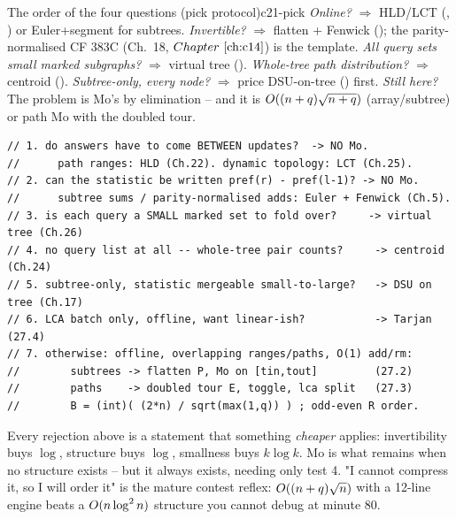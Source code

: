 \begin{definition}{The order of the four questions (pick protocol)}{c21-pick}
\emph{Online?} \(\Rightarrow\) HLD/LCT (, ) or Euler+segment
for subtrees.  \emph{Invertible?} \(\Rightarrow\) flatten + Fenwick
(); the parity-normalised CF 383C (Ch.~18, \(\chref{c14}\)) is the
template.  \emph{All query sets
small marked subgraphs?} \(\Rightarrow\) virtual tree ().
\emph{Whole-tree path distribution?} \(\Rightarrow\) centroid ().
\emph{Subtree-only, every node?} \(\Rightarrow\) price DSU-on-tree ()
first.  \emph{Still here?} The problem is Mo's by elimination -- and it is
\(O((n+q)\sqrt{n+q})\) (array/subtree) or path Mo with the doubled tour.
\end{definition}

\begin{lstlisting}[caption={The pick protocol as a decision skeleton -- paste-ready comments for contest code; each branch names the chapter that owns the technique}, label={lst:c21-kit}]
// 1. do answers have to come BETWEEN updates?  -> NO Mo.
//      path ranges: HLD (Ch.22). dynamic topology: LCT (Ch.25).
// 2. can the statistic be written pref(r) - pref(l-1)? -> NO Mo.
//      subtree sums / parity-normalised adds: Euler + Fenwick (Ch.5).
// 3. is each query a SMALL marked set to fold over?     -> virtual tree (Ch.26)
// 4. no query list at all -- whole-tree pair counts?     -> centroid (Ch.24)
// 5. subtree-only, statistic mergeable small-to-large?   -> DSU on tree (Ch.17)
// 6. LCA batch only, offline, want linear-ish?           -> Tarjan (27.4)
// 7. otherwise: offline, overlapping ranges/paths, O(1) add/rm:
//        subtrees -> flatten P, Mo on [tin,tout]         (27.2)
//        paths    -> doubled tour E, toggle, lca split   (27.3)
//        B = (int)( (2*n) / sqrt(max(1,q)) ) ; odd-even R order.
\end{lstlisting}

\begin{insightbox}
Every rejection above is a statement that something \emph{cheaper} applies:
invertibility buys \(\log\), structure buys \(\log\), smallness buys \(k\log k\).
Mo is what remains when no structure exists -- but it always exists, needing
only test 4.  "I cannot compress it, so I will order it" is the mature
contest reflex: \(O((n+q)\sqrt n)\) with a 12-line engine beats a
\(O(n\log^2 n)\) structure you cannot debug at minute 80.
\end{insightbox}

